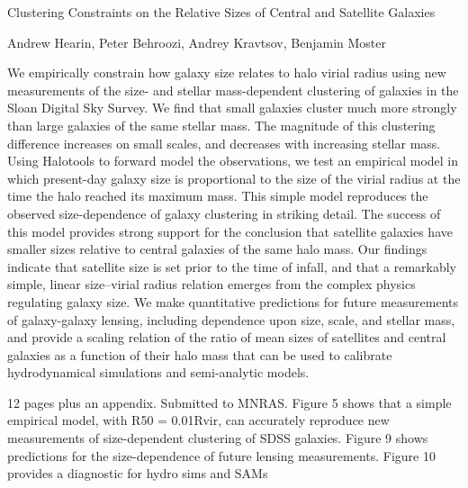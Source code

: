 Clustering Constraints on the Relative Sizes of Central and Satellite Galaxies

Andrew Hearin, Peter Behroozi, Andrey Kravtsov, Benjamin Moster

We empirically constrain how galaxy size relates to halo virial radius using new measurements of the size- and stellar mass-dependent clustering of galaxies in the Sloan Digital Sky Survey.  We find that small galaxies cluster much more strongly than large galaxies of the same stellar mass. The magnitude of this clustering difference increases on small scales, and decreases with increasing stellar mass. Using Halotools to forward model the observations, we test an empirical model in which present-day galaxy size is proportional to the size of the virial radius at the time the halo reached its maximum mass. This simple model reproduces the observed size-dependence of galaxy clustering in striking detail. The success of this model provides strong support for the conclusion that satellite galaxies have smaller sizes relative to central galaxies of the same halo mass. Our findings indicate that satellite size is set prior to the time of infall, and that a remarkably simple, linear size--virial radius relation emerges from the complex physics regulating galaxy size. We make quantitative predictions for future measurements of galaxy-galaxy lensing, including dependence upon size, scale, and stellar mass, and provide a scaling relation of the ratio of mean sizes of satellites and central galaxies as a function of their halo mass that can be used to calibrate hydrodynamical simulations and semi-analytic models. 


12 pages plus an appendix. Submitted to MNRAS. 
Figure 5 shows that a simple empirical model, with R50 = 0.01Rvir, can accurately reproduce new measurements of size-dependent clustering of SDSS galaxies. Figure 9 shows predictions for the size-dependence of future lensing measurements. Figure 10 provides a diagnostic for hydro sims and SAMs



